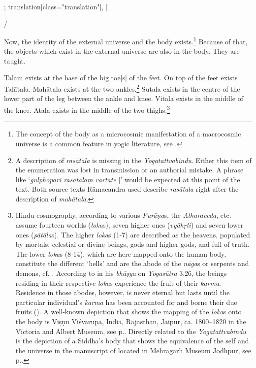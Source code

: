 \begin{alignment}[
  texts=edition[class="edition"];
  translation[class="translation"],
  ]
\begin{edition}
\begin{prose}[p32_01]
/
      \end{prose}
  \end{edition}
  \begin{translation}
  \begin{tlate}[p32_01]
Now, the identity of the external universe and the body exists.\footnote{The concept of the body as a microcosmic manifestation of a macrocosmic universe is a common feature in yogic literature, see \citeauthor[2017:174-178]{rootsofyoga2017}.} Because of that, the objects which exist in the external universe are also in the body. They are taught.

Talam exists at the base of the big toe[s] of the feet. On top of the feet exists Talātala. Mahātala exists at the two ankles.\footnote{A description of \textit{rasātala} is missing in the \textit{Yogatattvabindu}. Either this item of the enumeration was lost in transmission or an authorial mistake. A phrase like `\textit{gulphopari rasātalaṃ vartate} |' would be expected at this point of the text. Both source texts Rāmacandra used describe \textit{rasātala} right after the description of \textit{mahātala}.} Sutala exists in the centre of the lower part of the leg between the ankle and knee. Vitala exists in the middle of the knee. Atala exists in the middle of the two thighs.\footnote{Hindu cosmography, according to various \textit{Purāṇa}s, the \textit{Atharaveda}, etc. assume fourteen worlds (\textit{loka}s), seven higher ones (\textit{vyāhṛti}) and seven lower ones (\textit{pātāla}s). The higher \textit{loka}s (1-7) are described as the heavens, populated by mortals, celestial or divine beings, gods and higher gods, and full of truth. The lower \textit{loka}s (8-14), which are here mapped onto the human body, constitute the different `hells' and are the abode of the \textit{nāga}s or serpents and demons, cf. \citeauthor[2011:503-504]{haag2012}. According to \citeauthor{yogasutra} in his \textit{bhāṣya} on \textit{Yogasūtra} 3.26, the beings residing in their respective \textit{loka}s experience the fruit of their \textit{karma}. Residence in those abodes, however, is never eternal but lasts until the particular individual's \textit{karma} has been accounted for and borne their due fruits (\citeauthor[2009:353]{bryant2009}). A well-known depiction that shows the mapping of the \textit{loka}s onto the body is Viṣṇu Viśvarūpa, India, Rajasthan, Jaipur, ca. 1800–1820 in the Victoria and Albert Museum, see p.\pageref{fig1}. Directly related to the \textit{Yogatattvabindu} is the depiction of a Siddha's body that shows the equivalence of the self and the universe in the manuscript of  located in Mehragarh Museum Jodhpur, see p.\pageref{fig2}.}
\flushpage
    \end{tlate}
  \end{translation}
\end{alignment}

